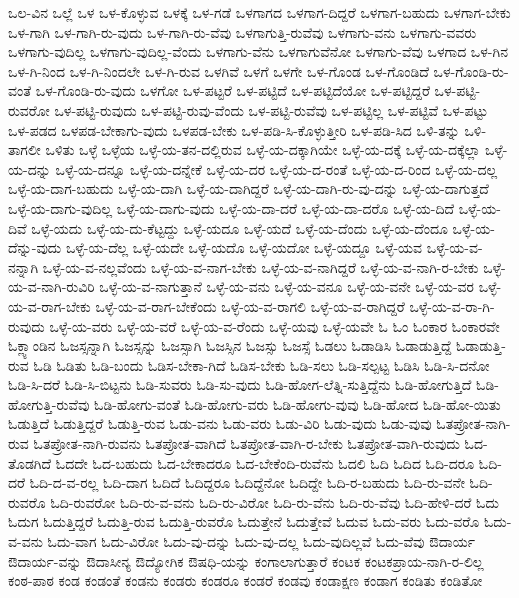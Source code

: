 {ಒಲ-ವಿನ
ಒಲ್ಲೆ
ಒಳ
ಒಳ-ಕೊಳ್ಳುವ
ಒಳಕ್ಕೆ
ಒಳ-ಗಡೆ
ಒಳಗಾಗದ
ಒಳಗಾಗ-ದಿದ್ದರೆ
ಒಳಗಾಗ-ಬಹುದು
ಒಳಗಾಗ-ಬೇಕು
ಒಳ-ಗಾಗಿ
ಒಳ-ಗಾಗಿ-ರು-ವುದು
ಒಳ-ಗಾಗಿ-ರು-ವೆವು
ಒಳಗಾಗುತ್ತಿ-ರುವೆವು
ಒಳಗಾಗು-ವನು
ಒಳಗಾಗು-ವವರು
ಒಳಗಾಗು-ವುದಿಲ್ಲ
ಒಳಗಾಗು-ವುದಿಲ್ಲ-ವೆಂದು
ಒಳಗಾಗು-ವೆನು
ಒಳಗಾಗುವೆನೋ
ಒಳಗಾಗು-ವೆವು
ಒಳಗಾದ
ಒಳ-ಗಿನ
ಒಳ-ಗಿ-ನಿಂದ
ಒಳ-ಗಿ-ನಿಂದಲೇ
ಒಳ-ಗಿ-ರುವ
ಒಳಗಿವೆ
ಒಳಗೆ
ಒಳಗೇ
ಒಳ-ಗೊಂಡ
ಒಳ-ಗೊಂಡಿದೆ
ಒಳ-ಗೊಂಡಿ-ರು-ವಂತೆ
ಒಳ-ಗೊಂಡಿ-ರು-ವುದು
ಒಳಗೋ
ಒಳ-ಪಟ್ಟರೆ
ಒಳ-ಪಟ್ಟಿದೆ
ಒಳ-ಪಟ್ಟಿದೆಯೋ
ಒಳ-ಪಟ್ಟಿದ್ದರೆ
ಒಳ-ಪಟ್ಟಿ-ರುವರೋ
ಒಳ-ಪಟ್ಟಿ-ರುವುದು
ಒಳ-ಪಟ್ಟಿ-ರುವು-ವೆಂದು
ಒಳ-ಪಟ್ಟಿ-ರುವೆವು
ಒಳ-ಪಟ್ಟಿಲ್ಲ
ಒಳ-ಪಟ್ಟಿವೆ
ಒಳ-ಪಟ್ಟು
ಒಳ-ಪಡದ
ಒಳಪಡ-ಬೇಕಾಗು-ವುದು
ಒಳಪಡ-ಬೇಕು
ಒಳ-ಪಡಿ-ಸಿ-ಕೊಳ್ಳುತ್ತೀರಿ
ಒಳ-ಪಡಿ-ಸಿದ
ಒಳಿ-ತನ್ನು
ಒಳಿ-ತಾಗಲೀ
ಒಳಿತು
ಒಳ್ಳೆ
ಒಳ್ಳೆಯ
ಒಳ್ಳೆ-ಯ-ತನ-ದಲ್ಲಿರುವ
ಒಳ್ಳೆ-ಯ-ದಕ್ಕಾಗಿಯೇ
ಒಳ್ಳೆ-ಯ-ದಕ್ಕೆ
ಒಳ್ಳೆ-ಯ-ದಕ್ಕೆಲ್ಲಾ
ಒಳ್ಳೆ-ಯ-ದನ್ನು
ಒಳ್ಳೆ-ಯ-ದನ್ನೂ
ಒಳ್ಳೆ-ಯ-ದನ್ನೇಕೆ
ಒಳ್ಳೆ-ಯ-ದರ
ಒಳ್ಳೆ-ಯ-ದ-ರಂತೆ
ಒಳ್ಳೆ-ಯ-ದ-ರಿಂದ
ಒಳ್ಳೆ-ಯ-ದಲ್ಲ
ಒಳ್ಳೆ-ಯ-ದಾಗ-ಬಹುದು
ಒಳ್ಳೆ-ಯ-ದಾಗಿ
ಒಳ್ಳೆ-ಯ-ದಾಗಿದ್ದರೆ
ಒಳ್ಳೆ-ಯ-ದಾಗಿ-ರು-ವು-ದನ್ನು
ಒಳ್ಳೆ-ಯ-ದಾಗುತ್ತದೆ
ಒಳ್ಳೆ-ಯ-ದಾಗು-ವುದಿಲ್ಲ
ಒಳ್ಳೆ-ಯ-ದಾಗು-ವುದು
ಒಳ್ಳೆ-ಯ-ದಾ-ದರೆ
ಒಳ್ಳೆ-ಯ-ದಾ-ದರೊ
ಒಳ್ಳೆ-ಯ-ದಿದೆ
ಒಳ್ಳೆ-ಯ-ದಿವೆ
ಒಳ್ಳೆ-ಯದು
ಒಳ್ಳೆ-ಯ-ದು-ಕೆಟ್ಟದ್ದು
ಒಳ್ಳೆ-ಯದೂ
ಒಳ್ಳೆ-ಯದೆ
ಒಳ್ಳೆ-ಯ-ದೆಂದು
ಒಳ್ಳೆ-ಯ-ದೆಂದೂ
ಒಳ್ಳೆ-ಯ-ದೆನ್ನು-ವುದು
ಒಳ್ಳೆ-ಯ-ದೆಲ್ಲ
ಒಳ್ಳೆ-ಯದೇ
ಒಳ್ಳೆ-ಯದೊ
ಒಳ್ಳೆ-ಯದೋ
ಒಳ್ಳೆ-ಯದ್ದೂ
ಒಳ್ಳೆ-ಯವ
ಒಳ್ಳೆ-ಯ-ವ-ನನ್ನಾಗಿ
ಒಳ್ಳೆ-ಯ-ವ-ನಲ್ಲವೆಂದು
ಒಳ್ಳೆ-ಯ-ವ-ನಾಗ-ಬೇಕು
ಒಳ್ಳೆ-ಯ-ವ-ನಾಗಿದ್ದರೆ
ಒಳ್ಳೆ-ಯ-ವ-ನಾಗಿ-ರ-ಬೇಕು
ಒಳ್ಳೆ-ಯ-ವ-ನಾಗಿ-ರುವಿರಿ
ಒಳ್ಳೆ-ಯ-ವ-ನಾಗುತ್ತಾನೆ
ಒಳ್ಳೆ-ಯ-ವನು
ಒಳ್ಳೆ-ಯ-ವನೂ
ಒಳ್ಳೆ-ಯ-ವನೇ
ಒಳ್ಳೆ-ಯ-ವರ
ಒಳ್ಳೆ-ಯ-ವ-ರಾಗ-ಬೇಕು
ಒಳ್ಳೆ-ಯ-ವ-ರಾಗ-ಬೇಕೆಂದು
ಒಳ್ಳೆ-ಯ-ವ-ರಾಗಲಿ
ಒಳ್ಳೆ-ಯ-ವ-ರಾಗಿದ್ದರೆ
ಒಳ್ಳೆ-ಯ-ವ-ರಾ-ಗಿ-ರುವುದು
ಒಳ್ಳೆ-ಯ-ವರು
ಒಳ್ಳೆ-ಯ-ವರೆ
ಒಳ್ಳೆ-ಯ-ವ-ರೆಂದು
ಒಳ್ಳೆ-ಯವು
ಒಳ್ಳೆ-ಯವೇ
ಓ
ಓಂ
ಓಂಕಾರ
ಓಂಕಾರವೇ
ಓಕ್ಲ್ಯಾಂಡಿನ
ಓಜಸ್ಸನ್ನಾಗಿ
ಓಜಸ್ಸನ್ನು
ಓಜಸ್ಸಾಗಿ
ಓಜಸ್ಸಿನ
ಓಜಸ್ಸು
ಓಜಸ್ಸೆ
ಓಡಲು
ಓಡಾಡಿಸಿ
ಓಡಾಡುತ್ತಿದ್ದೆ
ಓಡಾಡುತ್ತಿ-ರುವ
ಓಡಿ
ಓಡಿತು
ಓಡಿ-ಬಂದು
ಓಡಿಸ-ಬೇಕಾ-ಗಿದೆ
ಓಡಿಸ-ಬೇಕು
ಓಡಿ-ಸಲು
ಓಡಿ-ಸಲ್ಪಟ್ಟ
ಓಡಿಸಿ
ಓಡಿ-ಸಿ-ದನೋ
ಓಡಿ-ಸಿ-ದರೆ
ಓಡಿ-ಸಿ-ಬಿಟ್ಟನು
ಓಡಿ-ಸುವರು
ಓಡಿ-ಸು-ವುದು
ಓಡಿ-ಹೋಗ-ಲೆತ್ನಿ-ಸುತ್ತಿದ್ದೆನು
ಓಡಿ-ಹೋಗುತ್ತಿದೆ
ಓಡಿ-ಹೋಗುತ್ತಿ-ರುವೆವು
ಓಡಿ-ಹೋಗು-ವಂತೆ
ಓಡಿ-ಹೋಗು-ವರು
ಓಡಿ-ಹೋಗು-ವುವು
ಓಡಿ-ಹೋದ
ಓಡಿ-ಹೋ-ಯಿತು
ಓಡುತ್ತಿದೆ
ಓಡುತ್ತಿದ್ದರೆ
ಓಡುತ್ತಿ-ರುವ
ಓಡು-ವನು
ಓಡು-ವರು
ಓಡು-ವಿರಿ
ಓಡು-ವುದು
ಓಡು-ವುವು
ಓತಪ್ರೋತ-ನಾಗಿ-ರುವ
ಓತಪ್ರೋತ-ನಾಗಿ-ರುವನು
ಓತಪ್ರೋತ-ವಾಗಿದೆ
ಓತಪ್ರೋತ-ವಾಗಿ-ರ-ಬೇಕು
ಓತಪ್ರೋತ-ವಾಗಿ-ರುವುದು
ಓದ-ತೊಡಗಿದೆ
ಓದದೇ
ಓದ-ಬಹುದು
ಓದ-ಬೇಕಾದರೂ
ಓದ-ಬೇಕೆಂದಿ-ರುವೆನು
ಓದಲಿ
ಓದಿ
ಓದಿದ
ಓದಿ-ದರೂ
ಓದಿ-ದರೆ
ಓದಿ-ದ-ವ-ರಲ್ಲ
ಓದಿ-ದಾಗ
ಓದಿದೆ
ಓದಿದ್ದರೂ
ಓದಿದ್ದೆನೋ
ಓದಿದ್ದೇ
ಓದಿ-ರ-ಬಹುದು
ಓದಿ-ರು-ವನೇ
ಓದಿ-ರುವರೊ
ಓದಿ-ರುವರೋ
ಓದಿ-ರು-ವ-ವನು
ಓದಿ-ರು-ವಿರೋ
ಓದಿ-ರು-ವೆನು
ಓದಿ-ರು-ವೆವು
ಓದಿ-ಹೇಳಿ-ದರೆ
ಓದು
ಓದುಗ
ಓದುತ್ತಿದ್ದರೆ
ಓದುತ್ತಿ-ರುವ
ಓದುತ್ತಿ-ರುವರೊ
ಓದುತ್ತೇನೆ
ಓದುತ್ತೇವೆ
ಓದುವ
ಓದು-ವರು
ಓದು-ವರೊ
ಓದು-ವ-ವನು
ಓದು-ವಾಗ
ಓದು-ವಿರೋ
ಓದು-ವು-ದನ್ನು
ಓದು-ವು-ದಲ್ಲ
ಓದು-ವುದಿಲ್ಲವೆ
ಓದು-ವೆವು
ಔದಾರ್ಯ
ಔದಾರ್ಯ-ವನ್ನು
ಔದಾಸೀನ್ಯ
ಔದ್ಯೋಗಿಕ
ಔಷಧಿ-ಯನ್ನು
ಕಂಗಾಲಾಗುತ್ತಾರೆ
ಕಂಟಕ
ಕಂಟಕಪ್ರಾಯ-ನಾಗಿ-ರ-ಲಿಲ್ಲ
ಕಂಠ-ಪಾಠ
ಕಂಡ
ಕಂಡಂತೆ
ಕಂಡನು
ಕಂಡರು
ಕಂಡರೂ
ಕಂಡರೆ
ಕಂಡವು
ಕಂಡಾಕ್ಷಣ
ಕಂಡಾಗ
ಕಂಡಿತು
ಕಂಡಿತೋ
}
